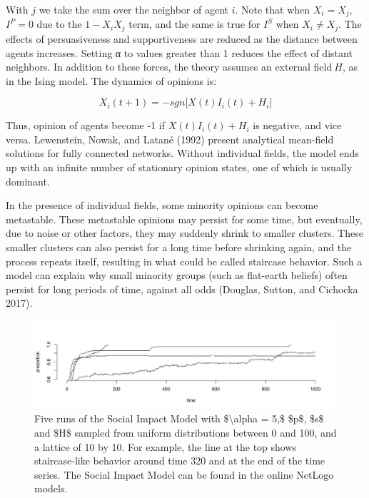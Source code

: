\documentclass[
  letterpaper,
]{scrbook}
\begin{document}
With \(j\) we take the sum over the neighbor of agent \(i\). Note that
when \(X_{i} = X_{j}\), \(I^{P} = 0\) due to the \(1 - X_{i}X_{j}\)
term, and the same is true for \(I^{S}\) when \(X_{i} \neq X_{j}\). The
effects of persuasiveness and supportiveness are reduced as the distance
between agents increases. Setting α to values greater than 1 reduces the
effect of distant neighbors. In addition to these forces, the theory
assumes an external field\(\ H\), as in the Ising model. The dynamics of
opinions is:

\[X_{i}(t + 1) = - sgn\lbrack X(t)I_{i}(t) + H_{i}\rbrack\]

Thus, opinion of agents become -1 if \(X(t)I_{i}(t) + H_{i}\) is
negative, and vice versa. Lewenstein, Nowak, and Latané (1992) present
analytical mean-field solutions for fully connected networks. Without
individual fields, the model ends up with an infinite number of
stationary opinion states, one of which is usually dominant.

In the presence of individual fields, some minority opinions can become
metastable. These metastable opinions may persist for some time, but
eventually, due to noise or other factors, they may suddenly shrink to
smaller clusters. These smaller clusters can also persist for a long
time before shrinking again, and the process repeats itself, resulting
in what could be called staircase behavior. Such a model can explain why
small minority groups (such as flat-earth beliefs) often persist for
long periods of time, against all odds (Douglas, Sutton, and Cichocka
2017).

\begin{figure}

{\centering \includegraphics[width=6.72685in,height=\textheight]{media/ch7/image6.jpg}

}

\caption{\label{fig-ch7-img6-old-94}Five runs of the Social Impact Model
with \$\textbackslash alpha = 5,\$ \$p\$, \$s\$ and \$H\$ sampled from
uniform distributions between 0 and 100, and a lattice of 10 by 10. For
example, the line at the top shows staircase-like behavior around time
320 and at the end of the time series. The Social Impact Model can be
found in the online NetLogo models.}

\end{figure}
\end{document}
